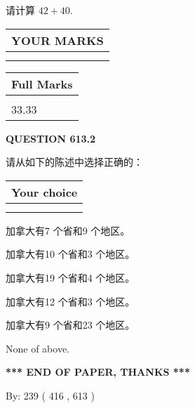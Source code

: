 \documentclass{ctexart}
\begin{document}
  
 
请计算 $ %
42 +  %
40 $.
 

 

 
  
\vspace{0.2in}
  
\noindent\begin{tabular}{|l|}
\hline
 YOUR MARKS  \\
\hline
 \\ 
 \\ 
\hline
\end{tabular}
\hspace{0.05in} \begin{tabular}{|l|}
\hline
 Full Marks  \\
\hline
 \\ 
33.33 \\
\hline
\end{tabular}
{\textbf{\Large{QUESTION
613.2 
}}}
  
  
请从如下的陈述中选择正确的：
  
  
\noindent\hspace{3.0in} \begin{tabular}{|l|}
\hline
Your choice \\
\hline
 \\ 
 \\ 
\hline
\end{tabular}
  
  
 
 
加拿大有7 个省和9 个地区。
 
 
加拿大有10 个省和3 个地区。
 
 
加拿大有19 个省和4 个地区。
 
 
加拿大有12 个省和3 个地区。
 
 
加拿大有9 个省和23 个地区。
 
 
 None of above.
 
 
   
   
 \vspace{0.2in}
 
   
   
   
   
\vspace{1.0in} 
{\textbf{\large{ *** END OF PAPER, THANKS *** }}} 
   
   
\hspace{1.0in} By: 
 239 ( 416 ,  613 )
   
   
 
 
\end{document}
